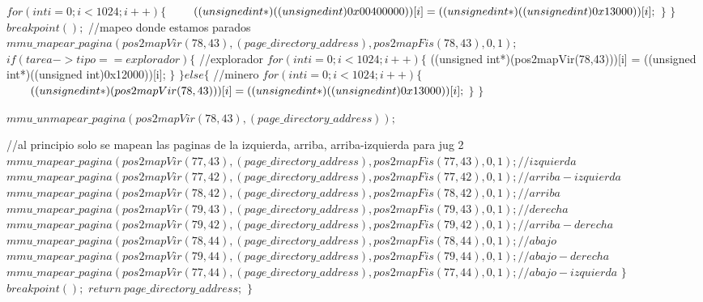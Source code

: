 \begin{algorithmic}
      \State \tab \tab \tab \tab $  for (int i = 0; i < 1024; i++) \{$
        \State \tab \tab \tab \tab $  \hspace*{7mm} ((unsigned int*)((unsigned int)0x00400000))[i] = ((unsigned int*)((unsigned int)0x13000))[i];$
      \State \tab \tab \tab \tab $ \}$
    \State \tab \tab \tab $ \}$
  \State \tab \tab \tab $   breakpoint();$
    //mapeo donde estamos parados
  \State \tab \tab \tab $   mmu\_mapear\_pagina(pos2mapVir(78,43), (page\_directory\_address), pos2mapFis(78,43), 0, 1);$
  \State \tab \tab \tab $   if (tarea->tipo == explorador) \{$
      //explorador
     \State \tab \tab \tab \tab $  for (int i = 0; i < 1024; i++) \{$
        ((unsigned int*)(pos2mapVir(78,43)))[i] = ((unsigned int*)((unsigned int)0x12000))[i];
      \State \tab \tab \tab \tab $ \}$
  \State \tab \tab \tab $  \} else \{$
      //minero
     \State \tab \tab \tab \tab $  for (int i = 0; i < 1024; i++) \{$
       \State \tab \tab \tab \tab $  \hspace*{7mm} ((unsigned int*)(pos2mapVir(78,43)))[i] = ((unsigned int*)((unsigned int)0x13000))[i];$
    \State \tab \tab \tab \tab $   \}$
  \State \tab \tab \tab $   \}$

  \State \tab \tab \tab $   mmu\_unmapear\_pagina(pos2mapVir(78,43), (page\_directory\_address));$

    //al principio solo se mapean las paginas de la izquierda, arriba, arriba-izquierda para jug 2
  \State \tab \tab \tab $   mmu\_mapear\_pagina(pos2mapVir(77,43), (page\_directory\_address), pos2mapFis(77,43), 0, 1);//izquierda$
  \State \tab \tab \tab $   mmu\_mapear\_pagina(pos2mapVir(77,42), (page\_directory\_address), pos2mapFis(77,42), 0, 1);//arriba-izquierda$
  \State \tab \tab \tab $   mmu\_mapear\_pagina(pos2mapVir(78,42), (page\_directory\_address), pos2mapFis(78,42), 0, 1);//arriba$
  \State \tab \tab \tab $   mmu\_mapear\_pagina(pos2mapVir(79,43), (page\_directory\_address), pos2mapFis(79,43), 0, 1);//derecha$
  \State \tab \tab \tab $   mmu\_mapear\_pagina(pos2mapVir(79,42), (page\_directory\_address), pos2mapFis(79,42), 0, 1);//arriba-derecha$
  \State \tab \tab \tab $   mmu\_mapear\_pagina(pos2mapVir(78,44), (page\_directory\_address), pos2mapFis(78,44), 0, 1);//abajo$
  \State \tab \tab \tab $   mmu\_mapear\_pagina(pos2mapVir(79,44), (page\_directory\_address), pos2mapFis(79,44), 0, 1);//abajo-derecha$
  \State \tab \tab \tab $   mmu\_mapear\_pagina(pos2mapVir(77,44), (page\_directory\_address), pos2mapFis(77,44), 0, 1);//abajo-izquierda$
\State \tab \tab $  \}$
\State \tab \tab  $ breakpoint();$
\State \tab \tab  $ return \ page\_directory\_address;$
\State \tab $ \}$
\end{algorithmic}


